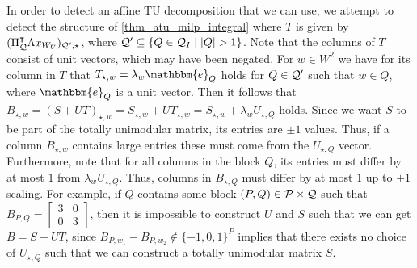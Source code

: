 \documentclass[pdflatex,sn-mathphys-num]{sn-jnl}%
\theoremstyle{thmstyleone}%
\theoremstyle{thmstylethree}%
\theoremstyle{thmstyletwo}%
\begin{document}
In order to detect an affine TU decomposition that we can use, we attempt to detect the structure of \cref{thm_atu_milp_integral} where $T$ is given by $(\Pi_{\mathcal{Q}}^{\intercal} \Lambda x_{W_U})_{\mathcal{Q}',\star}$, where $\mathcal{Q}' \subseteq  \{ Q\in \mathcal{Q}_I \mid |Q| > 1\}$. Note that the columns of $T$ consist of unit vectors, which may have been negated. For $w\in W^2$ we have for its column in $T$ that  $T_{\star,w} = \lambda_w \mathbbm{e}_{Q}$ holds for $Q\in \mathcal{Q}'$ such that $w\in Q$, where $\mathbbm{e}_{Q}$ is a unit vector.  
Then it follows that $B_{\star,w} = (S + U T)_{\star,w} = S_{\star,w} + U T_{\star,w} = S_{\star,w} + \lambda_w U_{\star,Q}$ holds. Since we want $S$ to be part of the totally unimodular matrix, its entries are $\pm 1$ values. Thus, if a column $B_{\star,w}$ contains large entries these must come from the $U_{\star,Q}$ vector. Furthermore, note that for all columns in the block $Q$, its entries must differ by at most $1$ from $\lambda_w U_{\star,Q}$. Thus, columns in $B_{\star,Q}$ must differ by at most $1$ up to $\pm 1$ scaling. For example, if $Q$ contains some block $(P,Q)\in \mathcal{P} \times \mathcal{Q}$ such that 
$B_{P,Q} = \begin{bmatrix}
    3 & 0 \\
    0 & 3
\end{bmatrix}$, then it is impossible to construct $U$ and $S$ such that we can get $B = S + U T$, since $B_{P,w_1} - B_{P,w_2} \notin \{-1,0,1\}^P$ implies that there exists no choice of $U_{\star,Q}$ such that we can construct a totally unimodular matrix $S$. \\
\end{document}
